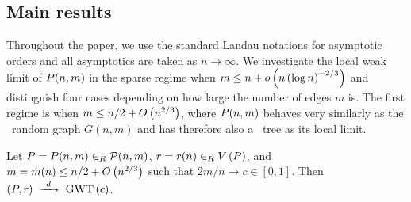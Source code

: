 \subsection{Main results}\label{LSsub:main}
Throughout the paper, we use the standard Landau notations for asymptotic orders and all asymptotics are taken as $n\to\infty$. We investigate the local weak limit of $P(n,m)$ in the sparse regime when $m\leq n+o\left(n\left(\log n\right)^{-2/3}\right)$ and distinguish four cases depending on how large the number of edges $m$ is. The first regime is when $m\leq n/2+O\left(n^{2/3}\right)$, where $P(n,m)$ behaves very similarly as the \ER\ random graph $G(n,m)$ and has therefore also a \GW\ tree as its local limit.
\begin{thm}\label{LSthm:main1}
Let $P=P(n,m)\in_R\mathcal{P}(n,m)$, $r=r(n)\in_R V\left(P\right)$, and $m=m(n)\leq n/2+O\left(n^{2/3}\right)$ such that $2m/n \to c\in[0,1]$. Then $\left(P, r\right)~\xrightarrow{~d~}~\operatorname{GWT}\left(c\right)$.	
\end{thm}

